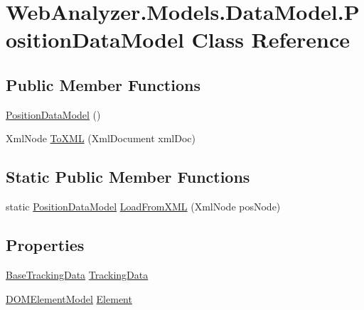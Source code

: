 \hypertarget{class_web_analyzer_1_1_models_1_1_data_model_1_1_position_data_model}{}\section{Web\+Analyzer.\+Models.\+Data\+Model.\+Position\+Data\+Model Class Reference}
\label{class_web_analyzer_1_1_models_1_1_data_model_1_1_position_data_model}
\subsection*{Public Member Functions}
\begin{DoxyCompactItemize}
\item 
\hyperlink{class_web_analyzer_1_1_models_1_1_data_model_1_1_position_data_model_ad8fdd7054415f4211babc9a8b838ed22}{Position\+Data\+Model} ()
\item 
Xml\+Node \hyperlink{class_web_analyzer_1_1_models_1_1_data_model_1_1_position_data_model_a371659171eacec3ce6a1f641a11df165}{To\+X\+M\+L} (Xml\+Document xml\+Doc)
\end{DoxyCompactItemize}
\subsection*{Static Public Member Functions}
\begin{DoxyCompactItemize}
\item 
static \hyperlink{class_web_analyzer_1_1_models_1_1_data_model_1_1_position_data_model}{Position\+Data\+Model} \hyperlink{class_web_analyzer_1_1_models_1_1_data_model_1_1_position_data_model_a685b721ae7f666981d7da3e599641cb0}{Load\+From\+X\+M\+L} (Xml\+Node pos\+Node)
\end{DoxyCompactItemize}
\subsection*{Properties}
\begin{DoxyCompactItemize}
\item 
\hyperlink{class_web_analyzer_1_1_models_1_1_base_1_1_base_tracking_data}{Base\+Tracking\+Data} \hyperlink{class_web_analyzer_1_1_models_1_1_data_model_1_1_position_data_model_a1a065fa193e20137daa08472eefafd66}{Tracking\+Data}
\item 
\hyperlink{class_web_analyzer_1_1_models_1_1_data_model_1_1_d_o_m_element_model}{D\+O\+M\+Element\+Model} \hyperlink{class_web_analyzer_1_1_models_1_1_data_model_1_1_position_data_model_a4825afc0a1ecf3eeb0876be8611111ba}{Element}
\end{DoxyCompactItemize}
